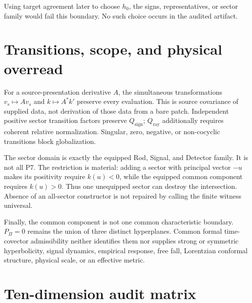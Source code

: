 \documentclass[11pt]{article}
\newcommand{\Qray}{Q_{\mathrm{ray}}}
\newcommand{\Qsign}{Q_{\mathrm{sign}}}
\begin{document}
Using target agreement later to choose $h_0$, the signs, representatives, or
sector family would fail this boundary.  No such choice occurs in the audited
artifact.

\section{Transitions, scope, and physical overread}

For a source-presentation derivative $A$, the simultaneous transformations
$v_s\mapsto Av_s$ and $k\mapsto A^*k'$ preserve every evaluation.  This is
source covariance of supplied data, not derivation of those data from a bare
patch.  Independent positive sector transition factors preserve $\Qsign$;
$\Qray$ additionally requires coherent relative normalization.  Singular,
zero, negative, or non-cocyclic transitions block globalization.

The sector domain is exactly the equipped Rod, Signal, and Detector family.
It is not all P7.  The restriction is material: adding a sector with principal
vector $-u$ makes its positivity require $k(u)<0$, while the equipped common
component requires $k(u)>0$.  Thus one unequipped sector can destroy the
intersection.  Absence of an all-sector constructor is not repaired by calling
the finite witness universal.

Finally, the common component is not one common characteristic boundary.
$P_\Pi=0$ remains the union of three distinct hyperplanes.  Common formal
time-covector admissibility neither identifies them nor supplies strong or
symmetric hyperbolicity, signal dynamics, empirical response, free fall,
Lorentzian conformal structure, physical scale, or an effective metric.

\section{Ten-dimension audit matrix}
\end{document}
